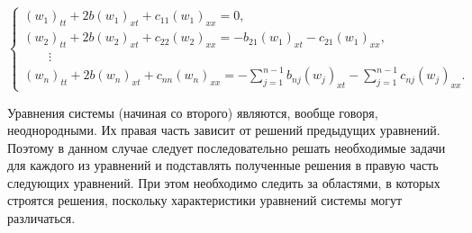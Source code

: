 \begin{equation}

\label{2:sys_triang}

\left\{

  \begin{array}{l}

    (w_1)_{tt}+2b(w_1)_{xt}+c_{11}(w_1)_{xx}=0, \\

    (w_2)_{tt}+2b(w_2)_{xt}+c_{22}(w_2)_{xx}=-b_{21}(w_1)_{xt}-c_{21}(w_1)_{xx}, \\


    ~~~~~~~~~\vdots \\

    (w_n)_{tt}+2b(w_n)_{xt}+c_{nn}(w_n)_{xx}=-\sum_{j=1}^{n-1}{b_{nj}(w_{j})_{xt}}-\sum_{j=1}^{n-1}{c_{nj}({w_j})_{xx}}.

  \end{array}

\right.

\end{equation}

Уравнения системы (начиная со второго) являются, вообще говоря, неоднородными. Их правая часть зависит от решений предыдущих уравнений. Поэтому в данном случае следует последовательно решать необходимые задачи для каждого из уравнений и подставлять полученные решения в правую часть следующих уравнений. При этом необходимо следить за областями, в которых строятся решения, поскольку характеристики уравнений системы могут различаться.




%






